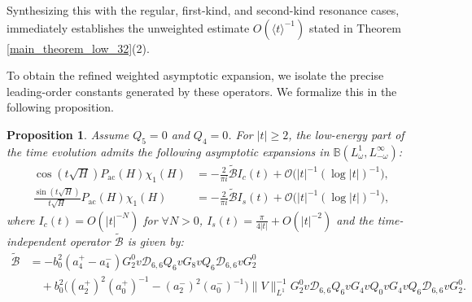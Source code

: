 \documentclass[reqno]{amsart}
\newtheorem{proposition}[theorem]{Proposition}
\numberwithin{equation}{section}
\begin{document}
Synthesizing this with the regular, first-kind, and second-kind resonance cases, immediately establishes the unweighted estimate ${O}(\langle t \rangle^{-1})$  stated in Theorem \ref{main_theorem_low_32}(2).

To obtain the refined weighted asymptotic expansion, we isolate the precise leading-order constants generated by these operators. We formalize this in the following proposition.

\begin{proposition}\label{prop_part2}  
	Assume $Q_5 = 0$ and $Q_4 = 0$. For $|t|\ge 2$, the low-energy part  of the time evolution admits the following asymptotic expansions in $\mathbb{B}(L^1_\omega, L^\infty_{-\omega})$:
	\[
		\begin{aligned}
			\cos(t\sqrt{H}) P_{\mathrm{ac}}(H) \chi_1(H) &= -\frac{2}{\pi i}\widetilde{{\mathcal{B}}} I_c(t) + \mathcal{O}\!\bigl( |t|^{-1} (\log |t|)^{-1} \bigr), \\[4pt]  
			\frac{\sin(t\sqrt{H})}{t\sqrt{H}} P_{\mathrm{ac}}(H) \chi_1(H) &= -\frac{2}{\pi i}\widetilde{\mathcal{B}} I_s(t) + \mathcal{O}\!\bigl( |t|^{-1} (\log |t|)^{-1} \bigr),  
		\end{aligned}
	\]
	where  $I_c(t) = {O}(|t|^{-N})$ for   $\forall N>0$,  $I_s(t) = \frac{\pi}{4|t|} + {O}(|t|^{-2})$ and the time-independent  operator $\widetilde{\mathcal{B}}$ is given by:  
	\begin{equation}  \label{mathcal B}
		\begin{split}
			\widetilde{\mathcal{B}} &= - b_0^2(a_4^+ - a_4^-) G_2^0 v \mathcal{D}_{6,6} Q_6 v G_8 v Q_6 \mathcal{D}_{6,6} v G_2^0 \\  
			&\quad + b_0^2\bigl((a_2^+)^2 (a_0^+)^{-1} - (a_2^-)^2 (a_0^-)^{-1}\bigr)\|V\|_{L^1}^{-1} G_2^0 v \mathcal{D}_{6,6} Q_6 v G_4 v Q_0 v G_4 v Q_6 \mathcal{D}_{6,6} v G_2^0.  
		\end{split}
	\end{equation}
\end{proposition}
\end{document}
